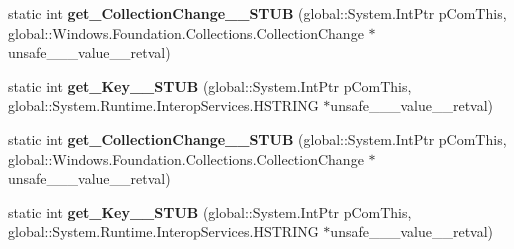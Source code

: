 \begin{DoxyCompactItemize}
\item 
\mbox{\label{struct_windows_1_1_foundation_1_1_collections_1_1_i_map_changed_event_args___a__string___v_______impl_1_1_vtbl_a9c8b411e0f3cc163f8ffe5b81bb3e3f0}} 
static int {\bfseries get\+\_\+\+Collection\+Change\+\_\+\+\_\+\+S\+T\+UB} (global\+::\+System.\+Int\+Ptr p\+Com\+This, global\+::\+Windows.\+Foundation.\+Collections.\+Collection\+Change $\ast$unsafe\+\_\+\+\_\+\+\_\+value\+\_\+\+\_\+retval)
\item 
\mbox{\label{struct_windows_1_1_foundation_1_1_collections_1_1_i_map_changed_event_args___a__string___v_______impl_1_1_vtbl_a81ce24d6887200b2c88559dd613b1d94}} 
static int {\bfseries get\+\_\+\+Key\+\_\+\+\_\+\+S\+T\+UB} (global\+::\+System.\+Int\+Ptr p\+Com\+This, global\+::\+System.\+Runtime.\+Interop\+Services.\+H\+S\+T\+R\+I\+NG $\ast$unsafe\+\_\+\+\_\+\+\_\+value\+\_\+\+\_\+retval)
\item 
\mbox{\label{struct_windows_1_1_foundation_1_1_collections_1_1_i_map_changed_event_args___a__string___v_______impl_1_1_vtbl_a9c8b411e0f3cc163f8ffe5b81bb3e3f0}} 
static int {\bfseries get\+\_\+\+Collection\+Change\+\_\+\+\_\+\+S\+T\+UB} (global\+::\+System.\+Int\+Ptr p\+Com\+This, global\+::\+Windows.\+Foundation.\+Collections.\+Collection\+Change $\ast$unsafe\+\_\+\+\_\+\+\_\+value\+\_\+\+\_\+retval)
\item 
\mbox{\label{struct_windows_1_1_foundation_1_1_collections_1_1_i_map_changed_event_args___a__string___v_______impl_1_1_vtbl_a81ce24d6887200b2c88559dd613b1d94}} 
static int {\bfseries get\+\_\+\+Key\+\_\+\+\_\+\+S\+T\+UB} (global\+::\+System.\+Int\+Ptr p\+Com\+This, global\+::\+System.\+Runtime.\+Interop\+Services.\+H\+S\+T\+R\+I\+NG $\ast$unsafe\+\_\+\+\_\+\+\_\+value\+\_\+\+\_\+retval)
\item 
\mbox{\label{struct_windows_1_1_foundation_1_1_collections_1_1_i_map_changed_event_args___a__string___v_______impl_1_1_vtbl_a9c8b411e0f3cc163f8ffe5b81bb3e3f0}} 

\end{DoxyCompactItemize}
